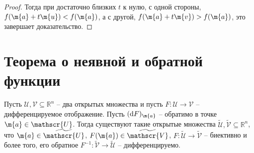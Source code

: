 \begin{proof}
Тогда при достаточно близких $t$ к нулю, с одной стороны, $f(\m{a} + t \m{u}) < f(\m{a})$, а с другой, $f(\m{a} + t \m{v}) > f(\m{a})$, это завершает доказательство. 
\end{proof}


\section{Теорема о неявной и обратной функции}


\begin{theorem}\label{inverse_function_theorem}
   Пусть $\mathscr{U}, \mathscr{V} \subseteq \mathbb{R}^n$ -- два открытых множества и пусть $F:\mathscr{U} \to \mathscr{V}$ -- дифференцируемое отображение. Пусть $(\mathrm{d}F)_\m{a}$ -- обратимо в точке $\m{a} \in \mathscr{U}$. Тогда существуют такие открытые множества $\widetilde{\mathscr{U}}, \widetilde{\mathscr{V}} \subseteq \mathbb{R}^n$, что $\m{a} \in \widetilde{\mathscr{U}}$, $F(\m{a}) \in \widetilde{\mathscr{V}}$, $ F: \widetilde{\mathscr{U}} \to \widetilde{\mathscr{V}}$ -- биективно и более того, его обратное $F^{-1}:\widetilde{\mathscr{V}} \to \widetilde{\mathscr{U}}$ -- дифференцируемо.
\end{theorem}


